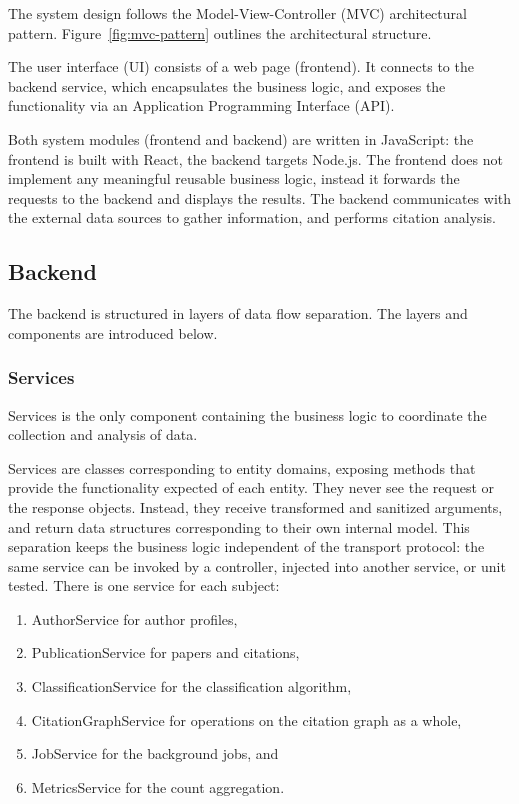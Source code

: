 The system design follows the Model-View-Controller (MVC) architectural pattern.
Figure~\ref{fig:mvc-pattern} outlines the architectural structure.


The user interface (UI) consists of a web page (frontend). 
It connects to the backend service, which encapsulates the business logic, and exposes the functionality via an Application Programming Interface (API).

Both system modules (frontend and backend) are written in \textsf{JavaScript}: the frontend is built with \textsf{React}, the backend targets \textsf{Node.js}.
The frontend does not implement any meaningful reusable business logic, instead it forwards the requests to the backend and displays the results.
The backend communicates with the external data sources to gather information, and performs citation analysis.

\subsection{Backend} \label{sec:backend-layers}

The backend is structured in layers of data flow separation.
The layers and components are introduced below. 

\subsubsection{Services}

Services is the only component containing the business logic to coordinate the collection and analysis of data.

Services are classes corresponding to entity domains, exposing methods that provide the functionality expected of each entity.
They never see the request or the response objects.
Instead, they receive transformed and sanitized arguments, and return data structures corresponding to their own internal model.
This separation keeps the business logic independent of the transport protocol: the same service can be invoked by a controller, injected into another service, or unit tested.
There is one service for each subject:
\begin{enumerate}
\item
\textsf{AuthorService} for author profiles, 
\item
\textsf{PublicationService} for papers and citations, 
\item
\textsf{ClassificationService} for the classification algorithm, 
\item
\textsf{CitationGraphService} for operations on the citation graph as a whole, 
\item
\textsf{JobService} for the background jobs, and 
\item
\textsf{MetricsService} for the count aggregation.
\end{enumerate}

